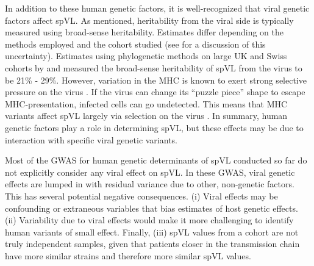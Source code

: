 \documentclass[11pt]{article}
\begin{document}
\begin{linenumbers}
In addition to these human genetic factors, it is well-recognized that viral genetic factors affect spVL. As mentioned, heritability from the viral side is typically measured using broad-sense heritability. Estimates differ depending on the methods employed and the cohort studied (see \citet{Mitov2018} for a discussion of this uncertainty). Estimates using phylogenetic methods on large UK and Swiss cohorts by \citet{Mitov2018} and \citet{Bertels2018} measured the broad-sense heritability of spVL from the virus to be 21\% - 29\%. However, variation in the MHC is known to exert strong selective pressure on the virus \citep{Kloverpris2016, Nguyen2021SystematicLink}. If the virus can change its ``puzzle piece'' shape to escape MHC-presentation, infected cells can go undetected. This means that MHC variants affect spVL largely via selection on the virus \citep{Bartha2017}. In summary, human genetic factors play a role in determining spVL, but these effects may be due to interaction with specific viral genetic variants.

Most of the GWAS for human genetic determinants of spVL conducted so far \citep{Dalmasso2008, Fellay2007, Pereyra2010, Fellay2009, Pelak2010, VanManen2011, McLaren2012, McLaren2015} do not explicitly consider any viral effect on spVL. In these GWAS, viral genetic effects are lumped in with residual variance due to other, non-genetic factors. This has several potential negative consequences. (i) Viral effects may be confounding or extraneous variables that bias estimates of host genetic effects. (ii) Variability due to viral effects would make it more challenging to identify human variants of small effect. Finally, (iii) spVL values from a cohort are not truly independent samples, given that patients closer in the transmission chain have more similar strains and therefore more similar spVL values.


\end{linenumbers}
\end{document}
